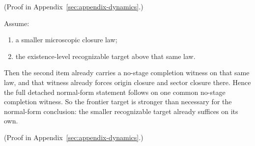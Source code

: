 (Proof in Appendix~\ref{sec:appendix-dynamics}.)

\begin{corollary}
\label{cor:recognizable-target-closes-the-full-detached-normal-form-capstone}
Assume:
\begin{enumerate}
\item a smaller microscopic closure law;
\item the existence-level recognizable target above that same law.
\end{enumerate}
Then the second item already carries a no-stage completion witness on that same
law, and that witness already forces origin closure and sector closure there.
Hence the full detached normal-form statement follows on one common no-stage
completion witness. So the frontier target is stronger than
necessary for the normal-form conclusion: the smaller recognizable target
already suffices on its own.
\end{corollary}

(Proof in Appendix~\ref{sec:appendix-dynamics}.)

